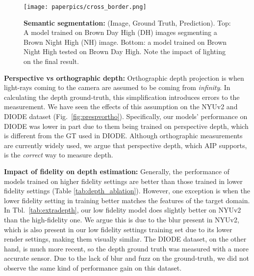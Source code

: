 \documentclass[runningheads]{llncs}
\begin{document}
\begin{figure}[t]
\centerline{\texttt{[image: paperpics/cross\_border.png]}}
\caption{\textbf{Semantic segmentation:} (Image, Ground Truth, Prediction). Top: A model trained on Brown Day High (DH) images segmenting a Brown Night High (NH) image. Bottom: a model trained on Brown Night High tested on Brown Day High. Note the impact of lighting on the final result.}
\label{fig:segablation}
\end{figure}

\vspace{0.5em}
\noindent\textbf{Perspective vs orthographic depth:} Orthographic depth projection is when light-rays coming to the camera are assumed to be coming from \textit{infinity}. In calculating the depth ground-truth, this simplification introduces errors to the measurement. We have seen the effects of this assumption on the NYUv2 and DIODE dataset (Fig.~\ref{fig:prespvortho}). Specifically, our models' performance on DIODE was lower in part due to them being trained on perspective depth, which is different from the GT used in DIODE. Although orthographic measurements are currently widely used, we argue that perspective depth, which AIP supports, is the \textit{correct} way to measure depth.




\vspace{0.5em}
\noindent\textbf{Impact of fidelity on depth estimation:}
Generally, the performance of models trained on higher fidelity settings are better than those trained in lower fidelity settings (Table \ref{tab:depth_ablation}). However, one exception is when the lower fidelity setting in training better matches the features of the target domain. In Tbl.~\ref{tab:extradepth}, our low fidelity model does slightly better on NYUv2 than the high-fidelity one. We argue this is due to the blur present in NYUv2, which is also present in our low fidelity settings training set due to its lower render settings, making them visually similar. The DIODE dataset, on the other hand, is much more recent, so the depth ground truth was measured with a more accurate sensor. Due to the lack of blur and fuzz on the ground-truth, we did not observe the same kind of performance gain on this dataset.
\end{document}
